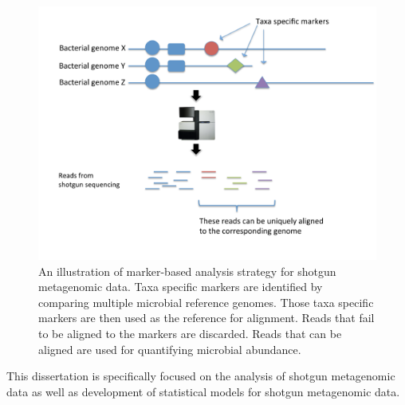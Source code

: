 \begin{figure}[p]
\begin{center}
\includegraphics[scale=0.55,trim=0 0 0 0,clip]{Figure/F11_MetaPhlAn.pdf}
\caption[An illustration of marker-based analysis strategy  for shotgun metagenomic data]{An illustration of marker-based analysis strategy  for shotgun metagenomic data. Taxa specific markers are identified by comparing multiple microbial reference genomes. Those taxa specific markers are then used as the reference for alignment. Reads that fail to be aligned to the markers are discarded. Reads that can be aligned are used for quantifying microbial abundance.} \label{F11_MetaPhlAn}
\end{center}
\end{figure}


This dissertation is specifically focused on the analysis of shotgun metagenomic data as well as development of statistical models for shotgun metagenomic data. 


